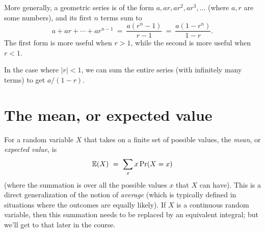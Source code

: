 More generally, a geometric series is of the form $a, ar, ar^2, ar^3, \ldots$
(where $a,r$ are some numbers), and its first $n$ terms sum to
$$ a + ar + \cdots + ar^{n-1} 
\ = \ 
\frac{a(r^n-1)}{r-1}
\ = \ 
\frac{a(1-r^n)}{1-r}.$$
The first form is more useful when $r > 1$, while the second is more useful when $r< 1$.

In the case where $|r| < 1$, we can sum the entire series (with infinitely many terms) 
to get $a/(1-r)$.

\section{The mean, or expected value}

For a random variable $X$ that takes on a finite set of possible values, the 
{\it mean}, or {\it expected value}, is
$$ \mathbb{E}(X) \ = \ \sum_{x} x \, \mbox{\rm Pr}(X = x) $$
(where the summation is over all the possible values $x$ that $X$ can have). This
is a direct generalization of the notion of {\it average} (which is typically
defined in situations where the outcomes are equally likely). If $X$ is a continuous 
random variable, then this summation needs to be replaced by an equivalent integral; 
but we'll get to that later in the course.

